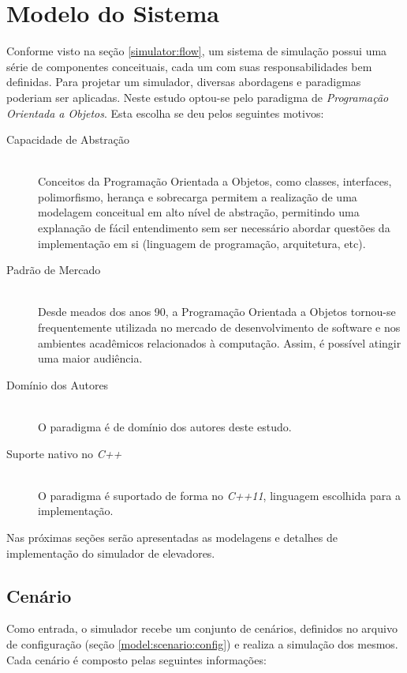 \chapter{\label{chap:model}Modelo do Sistema}

Conforme visto na seção \ref{simulator:flow}, um sistema de simulação possui uma
série de componentes conceituais, cada um com suas responsabilidades bem
definidas. Para projetar um simulador, diversas abordagens e paradigmas poderiam
ser aplicadas. Neste estudo optou-se pelo paradigma de \textit{Programação
Orientada a Objetos}. Esta escolha se deu pelos seguintes motivos:

\begin{description}
  \item[Capacidade de Abstração]\hfill \\
    Conceitos da Programação Orientada a Objetos, como classes, interfaces,
    polimorfismo, herança e sobrecarga permitem a realização de uma modelagem
    conceitual em alto nível de abstração, permitindo uma explanação de fácil
    entendimento sem ser necessário abordar questões da implementação em si
    (linguagem de programação, arquitetura, etc).
  \item[Padrão de Mercado]\hfill \\
    Desde meados dos anos 90, a Programação Orientada a Objetos tornou-se
    frequentemente utilizada no mercado de desenvolvimento de software e nos
    ambientes acadêmicos relacionados à computação. Assim, é possível atingir
    uma maior audiência.
  \item[Domínio dos Autores]\hfill \\
    O paradigma é de domínio dos autores deste estudo.
  \item[Suporte nativo no \textit{C++}]\hfill \\
    O paradigma é suportado de forma no \textit{C++11}, linguagem escolhida para
    a implementação.
\end{description}

Nas próximas seções serão apresentadas as modelagens e detalhes de implementação
do simulador de elevadores.

\section{\label{model:scenario}Cenário}

Como entrada, o simulador recebe um conjunto de cenários, definidos no arquivo
de configuração (seção \ref{model:scenario:config}) e realiza a simulação dos
mesmos. Cada cenário é composto pelas seguintes informações:

